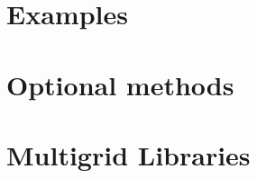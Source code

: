 \documentclass[x11names,twoside,english]{uiofysmaster}
\begin{document}
\chapter{Examples}
    
%
\chapter{Optional methods}
    
\chapter{Multigrid Libraries}
    

%     


%
\printbibliography
\end{document}
